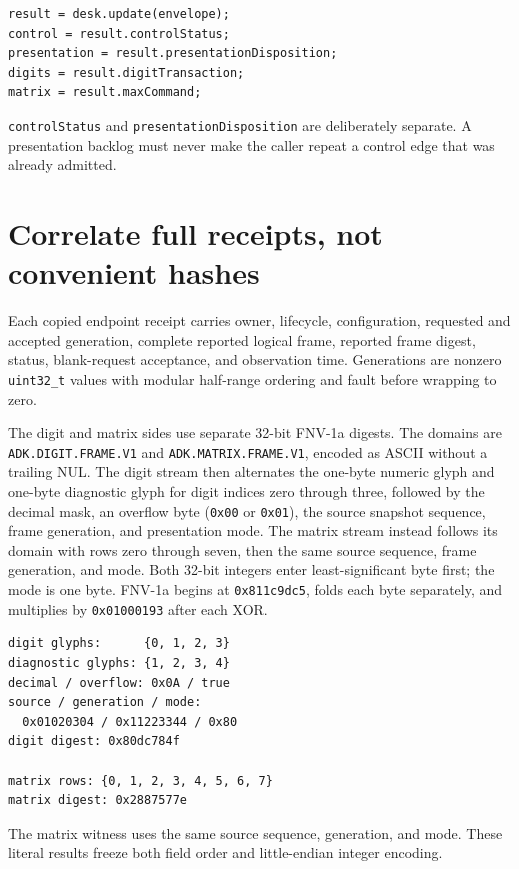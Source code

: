 \documentclass[10pt]{article}
\begin{document}
\begin{lstlisting}
result = desk.update(envelope);
control = result.controlStatus;
presentation = result.presentationDisposition;
digits = result.digitTransaction;
matrix = result.maxCommand;
\end{lstlisting}

\texttt{controlStatus} and \texttt{presentationDisposition} are deliberately
separate. A presentation backlog must never make the caller repeat a control
edge that was already admitted.

\section{Correlate full receipts, not convenient hashes}
Each copied endpoint receipt carries owner, lifecycle, configuration,
requested and accepted generation, complete reported logical frame, reported
frame digest, status, blank-request acceptance, and observation time.
Generations are nonzero \texttt{uint32\_t} values with modular half-range
ordering and fault before wrapping to zero.

The digit and matrix sides use separate 32-bit FNV-1a digests. The domains are
\texttt{ADK.DIGIT.FRAME.V1} and \texttt{ADK.MATRIX.FRAME.V1}, encoded as ASCII
without a trailing NUL. The digit stream then alternates the one-byte numeric
glyph and one-byte diagnostic glyph for digit indices zero through three,
followed by the decimal mask, an overflow byte (\texttt{0x00} or
\texttt{0x01}), the source snapshot sequence, frame generation, and
presentation mode. The matrix stream instead follows its domain with rows zero
through seven, then the same source sequence, frame generation, and mode.
Both 32-bit integers enter least-significant byte first; the mode is one byte.
FNV-1a begins at \texttt{0x811c9dc5}, folds each byte separately, and
multiplies by \texttt{0x01000193} after each XOR.

\begin{lstlisting}
digit glyphs:      {0, 1, 2, 3}
diagnostic glyphs: {1, 2, 3, 4}
decimal / overflow: 0x0A / true
source / generation / mode:
  0x01020304 / 0x11223344 / 0x80
digit digest: 0x80dc784f

matrix rows: {0, 1, 2, 3, 4, 5, 6, 7}
matrix digest: 0x2887577e
\end{lstlisting}

The matrix witness uses the same source sequence, generation, and mode. These
literal results freeze both field order and little-endian integer encoding.
\end{document}
